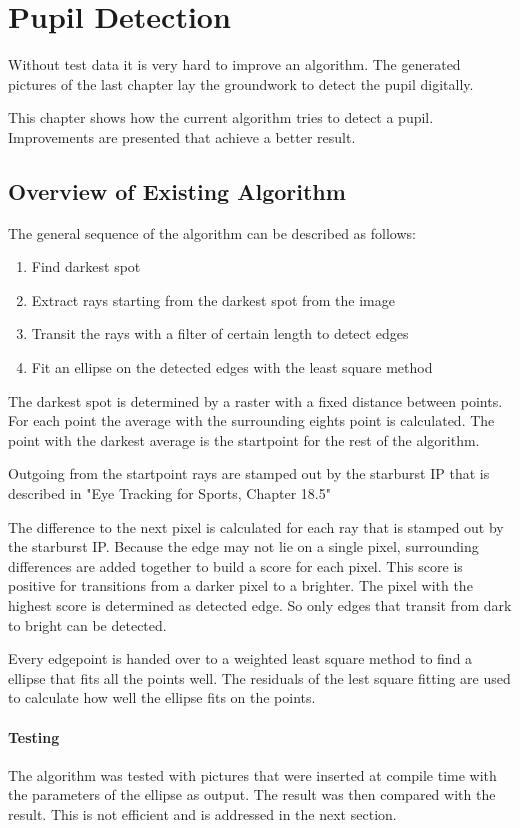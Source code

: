 \chapter{Pupil Detection}
\label{chap:pupildetection}
 Without test data it is very hard to improve an algorithm. The generated pictures of the last chapter lay the groundwork to detect the pupil digitally.
 
 This chapter shows how the current algorithm tries to detect a pupil. Improvements are presented that achieve a better result. 
\section{Overview of Existing Algorithm}
The general sequence of the algorithm can be described as follows:
\begin{enumerate}
	\item Find darkest spot
	\item Extract rays  starting from the darkest spot from the image
	\item Transit the rays with a filter of certain length to detect edges
	\item Fit an ellipse on the detected edges with the least square method
\end{enumerate}
The darkest spot is determined by a raster with a fixed distance between points. For each point the average with the surrounding eights point is calculated. The point with the darkest average is the startpoint for the rest of the algorithm.

Outgoing from the startpoint rays are stamped out by the starburst IP that is described in "Eye Tracking for Sports, Chapter 18.5" 

The difference to the next pixel is calculated for each ray that is stamped out by the starburst IP. Because the edge may not lie on a single pixel, surrounding differences are added together to build a score for each pixel. This score is positive for transitions from a darker pixel to a brighter. The pixel with the highest score is determined as detected edge. So only edges that transit from dark to bright can be detected.

Every edgepoint is handed over to a weighted least square method to find a ellipse that fits all the points well. The residuals of the lest square fitting are used to calculate how well the ellipse fits on the points.
\subsubsection{Testing}
The algorithm was tested with pictures that were inserted at compile time with the parameters of the ellipse as output. The result was then compared with the result. This is not efficient and is addressed in the next section.

